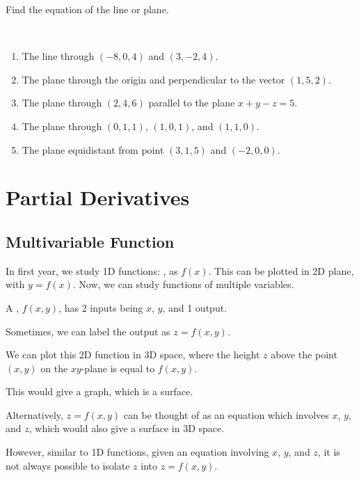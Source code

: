 \documentclass[11pt,fleqn]{book} %
\begin{document}
\begin{exercise}
    Find the equation of the line or plane.

    {~~~}

    \begin{enumerate}
        \item The line through $(-8, 0, 4)$ and $(3, -2, 4)$.
        \item The plane through the origin and perpendicular to the vector $(1, 5, 2)$.
        \item The plane through $(2, 4, 6)$ parallel to the plane $x + y - z = 5$.
        \item The plane through $(0, 1, 1)$, $(1, 0, 1)$, and $(1, 1, 0)$.
        \item The plane equidistant from point $(3, 1, 5)$ and $(-2, 0, 0)$.
    \end{enumerate}
\end{exercise}


\chapter{Partial Derivatives}

\section{Multivariable Function}

In first year, we study 1D functions: , as $f(x)$. This can be plotted in 2D plane, with $y = f(x)$. Now, we can study functions of multiple variables.

\begin{definition}[2D Function]
    A , $f(x, y)$, has 2 inputs being $x$, $y$, and 1 output.
\end{definition}

Sometimes, we can label the output as $z = f(x, y)$.

We can plot this 2D function in 3D space, where the height $z$ above the point $(x, y)$ on the $xy$-plane is equal to $f(x, y)$.

This would give a graph, which is a surface.

Alternatively, $z = f(x, y)$ can be thought of as an equation which involves $x$, $y$, and $z$, which would also give a surface in 3D space.

However, similar to 1D functions, given an equation involving $x$, $y$, and $z$, it is not always possible to isolate $z$ into $z = f(x, y)$.
\end{document}
